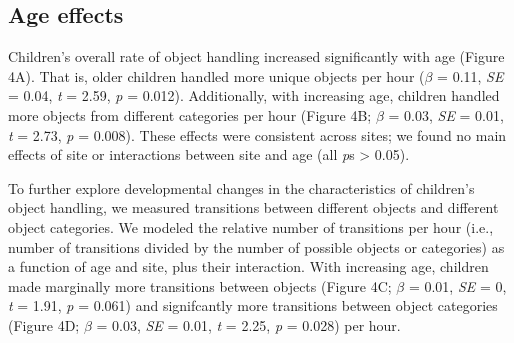 \documentclass[10pt, letterpaper]{article}
\begin{document}
\hypertarget{age-effects}{%
\subsection{Age effects}\label{age-effects}}

Children's overall rate of object handling increased significantly with
age (Figure 4A). That is, older children handled more unique objects per
hour (\(\beta\) = 0.11, \emph{SE} = 0.04, \emph{t} = 2.59, \emph{p} =
0.012). Additionally, with increasing age, children handled more objects
from different categories per hour (Figure 4B; \(\beta\) = 0.03,
\emph{SE} = 0.01, \emph{t} = 2.73, \emph{p} = 0.008). These effects were
consistent across sites; we found no main effects of site or
interactions between site and age (all \emph{p}s \textgreater{} 0.05).

To further explore developmental changes in the characteristics of
children's object handling, we measured transitions between different
objects and different object categories. We modeled the relative number
of transitions per hour (i.e., number of transitions divided by the
number of possible objects or categories) as a function of age and site,
plus their interaction. With increasing age, children made marginally
more transitions between objects (Figure 4C; \(\beta\) = 0.01, \emph{SE}
= 0, \emph{t} = 1.91, \emph{p} = 0.061) and signifcantly more
transitions between object categories (Figure 4D; \(\beta\) = 0.03,
\emph{SE} = 0.01, \emph{t} = 2.25, \emph{p} = 0.028) per hour.
\end{document}
